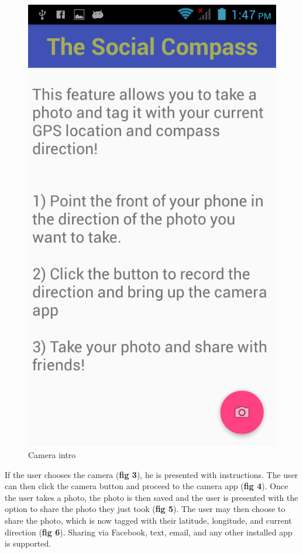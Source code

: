 \documentclass[12pt]{article}
\begin{document}
\begin{figure}[!htb]
\begin{minipage}[b]{.3\textwidth}
        \includegraphics[scale=1.2, width=\linewidth]{photo1.png}  
        \caption{Camera intro}  
    \end{minipage}  
\end{figure}


If the user chooses the camera (\textbf{fig 3}), he is presented with instructions. The user can then click the camera button and proceed to the camera app (\textbf{fig 4}). Once the user takes a photo, the photo is then saved and the user is presented with the option to share the photo they just took (\textbf{fig 5}). The user may then choose to share the photo, which is now tagged with their latitude, longitude, and current direction (\textbf{fig 6}). Sharing via Facebook, text, email, and any other installed app is supported.
\end{document}
